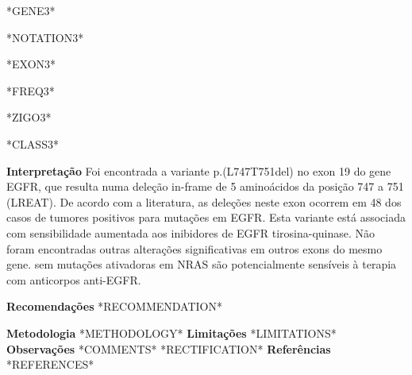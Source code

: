 \documentclass[12pt]{article}
\newcommand{\fakehline}[1][]{\begin{rulerbox}[#1] \end{rulerbox}}
\begin{document}
\begin{center}
\begin{tcbraster}[raster columns=6,raster column skip = -0.5pt, raster row skip = 0pt]
\begin{contentbox} *GENE3* \end{contentbox} \begin{contentbox} *NOTATION3* \end{contentbox}
\begin{contentbox} *EXON3* \end{contentbox} \begin{contentbox} *FREQ3* \end{contentbox} \begin{contentbox} *ZIGO3* \end{contentbox} \begin{contentbox} *CLASS3* \end{contentbox}
\fakehline\fakehline\fakehline\fakehline\fakehline\fakehline


\end{tcbraster}
\end{center}
\bigskip

{\selectfont{}\color{coolblack}\normalsize\bfseries Interpretação}\hfill\break
Foi encontrada a variante p.(L747\textunderscore T751del) no exon 19 do gene EGFR,  que resulta numa deleção in-frame de 5 aminoácidos da posição 747 a 751 (LREAT). De acordo com a literatura, as deleções neste exon ocorrem em 48 dos casos de tumores positivos para mutações em EGFR. Esta variante está associada com sensibilidade aumentada aos inibidores de EGFR tirosina-quinase. Não foram encontradas outras alterações significativas em outros exons do mesmo gene. sem mutações ativadoras em NRAS são potencialmente sensíveis à terapia com anticorpos anti-EGFR.
\bigskip

{\selectfont{}\color{coolblack}\normalsize\bfseries Recomendações}\hfill\break
*RECOMMENDATION*

\fakehline\fakehline\fakehline\fakehline\fakehline\fakehline

{\selectfont{}\color{coolblack}\footnotesize\bfseries Metodologia}\hfill\break
\footnotesize{*METHODOLOGY*}\hfill\break
{\selectfont{}\color{coolblack}\footnotesize\bfseries Limitações}\hfill\break
\footnotesize{*LIMITATIONS*}\hfill\break
{\selectfont{}\color{coolblack}\footnotesize\bfseries Observações}\hfill\break
\footnotesize{*COMMENTS*}\hfill\break
\footnotesize{*RECTIFICATION*}\hfill\break
{\selectfont{}\color{coolblack}\footnotesize\bfseries Referências}\hfill\break
\footnotesize{*REFERENCES*}\hfill\break
\bigskip
\end{document}

